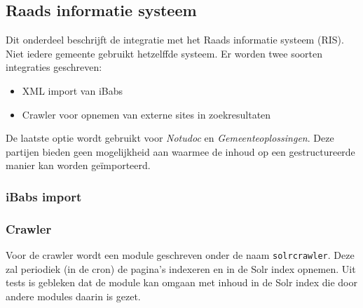 \subsection{Raads informatie systeem}

Dit onderdeel beschrijft de integratie met het Raads informatie systeem (RIS). Niet iedere gemeente gebruikt hetzelffde systeem. Er worden twee soorten integraties geschreven:
\begin{itemize}
\item XML import van iBabs
\item Crawler voor opnemen van externe sites in zoekresultaten
\end{itemize}
De laatste optie wordt gebruikt voor \emph{Notudoc} en \emph{Gemeenteoplossingen}. Deze partijen bieden geen mogelijkheid aan waarmee de inhoud op een gestructureerde manier kan worden ge\"{i}mporteerd.

\subsubsection{iBabs import}

\subsubsection{Crawler}

Voor de crawler wordt een module geschreven onder de naam \texttt{solrcrawler}. Deze zal periodiek (in de cron) de pagina's indexeren en in de Solr index opnemen. Uit tests is gebleken dat de  module kan omgaan met inhoud in de Solr index die door andere modules daarin is gezet.


